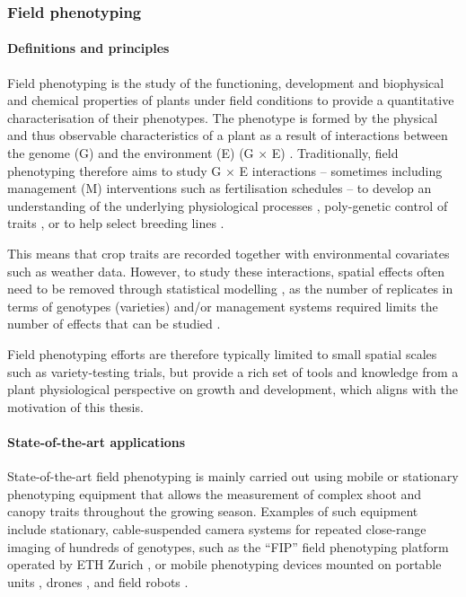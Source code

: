 \subsubsection{Field phenotyping}
\label{subsubsec:intro-field-phenotyping}
\paragraph{Definitions and principles}
Field phenotyping is the study of the functioning, development and biophysical and chemical properties of plants under field conditions \citep{walter_plant_2015} to provide a quantitative characterisation of their phenotypes. The phenotype is formed by the physical and thus observable characteristics of a plant as a result of interactions between the genome (G) and the environment (E) (G $\times$ E) \citep{johannsen_genotype_1911}. Traditionally, field phenotyping therefore aims to study G $\times$ E interactions -- sometimes including management (M) interventions such as fertilisation schedules \citep[for example]{rodene_uavbased_2022} -- to develop an understanding of the underlying physiological processes \citep{york_functional_2019}, poly-genetic control of traits \citep[for example]{singh_high-throughput_2019}, or to help select breeding lines \citep{pask_physiological_2012,roth_image-based_2023}.

This means that crop traits are recorded together with environmental covariates such as weather data. However, to study these interactions, spatial effects often need to be removed through statistical modelling \citep{piepho_twodimensional_2022}, as the number of replicates in terms of genotypes (varieties) and/or management systems required limits the number of effects that can be studied \citep{poorter_plant_1996}. 

Field phenotyping efforts are therefore typically limited to small spatial scales such as variety-testing trials, but provide a rich set of tools and knowledge from a plant physiological perspective on growth and development, which aligns with the motivation of this thesis.

\paragraph{State-of-the-art applications}
State-of-the-art field phenotyping is mainly carried out using mobile or stationary phenotyping equipment that allows the measurement of complex shoot and canopy traits throughout the growing season. Examples of such equipment include stationary, cable-suspended camera systems for repeated close-range imaging of hundreds of genotypes, such as the ``FIP'' field phenotyping platform operated by ETH Zurich \citep{kirchgessner_eth_2017}, or mobile phenotyping devices mounted on portable units \citep{crain_development_2016}, drones \citep{walter_advances_2022}, and field robots \citep{xu_review_2022}.

